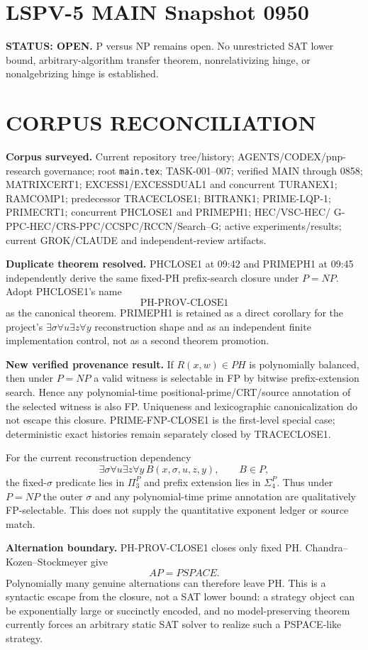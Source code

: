 \documentclass[11pt]{article}
\begin{document}
\section*{LSPV-5 MAIN Snapshot 0950}
\textbf{STATUS: OPEN.} P versus NP remains open. No unrestricted SAT lower bound,
arbitrary-algorithm transfer theorem, nonrelativizing hinge, or nonalgebrizing hinge is established.

\section*{CORPUS RECONCILIATION}
\textbf{Corpus surveyed.} Current repository tree/history; AGENTS/CODEX/pnp-research governance;
root \texttt{main.tex}; TASK-001--007; verified MAIN through 0858; MATRIXCERT1;
EXCESS1/EXCESSDUAL1 and concurrent TURANEX1; RAMCOMP1; predecessor TRACECLOSE1;
BITRANK1; PRIME-LQP-1; PRIMECRT1; concurrent PHCLOSE1 and PRIMEPH1; HEC/VSC-HEC/
G-PPC-HEC/CRS-PPC/CCSPC/RCCN/Search--G; active experiments/results; current GROK/CLAUDE
and independent-review artifacts.

\textbf{Duplicate theorem resolved.} PHCLOSE1 at 09:42 and PRIMEPH1 at 09:45 independently
derive the same fixed-PH prefix-search closure under \(P=NP\). Adopt PHCLOSE1's name
\[
\boxed{\text{PH-PROV-CLOSE1}}
\]
as the canonical theorem. PRIMEPH1 is retained as a direct corollary for the project's
\(\exists\sigma\forall u\exists z\forall y\) reconstruction shape and as an independent finite
implementation control, not as a second theorem promotion.

\textbf{New verified provenance result.}
If \(R(x,w)\in PH\) is polynomially balanced, then under \(P=NP\) a valid witness is selectable
in FP by bitwise prefix-extension search. Hence any polynomial-time positional-prime/CRT/source
annotation of the selected witness is also FP. Uniqueness and lexicographic canonicalization do not
escape this closure. PRIME-FNP-CLOSE1 is the first-level special case; deterministic exact histories
remain separately closed by TRACECLOSE1.

For the current reconstruction dependency
\[
\exists\sigma\forall u\exists z\forall y\,B(x,\sigma,u,z,y),\qquad B\in P,
\]
the fixed-\(\sigma\) predicate lies in \(\Pi_3^P\) and prefix extension lies in \(\Sigma_4^P\).
Thus under \(P=NP\) the outer \(\sigma\) and any polynomial-time prime annotation are
qualitatively FP-selectable. This does not supply the quantitative exponent ledger or source match.

\textbf{Alternation boundary.}
PH-PROV-CLOSE1 closes only fixed PH. Chandra--Kozen--Stockmeyer give
\[
AP=PSPACE.
\]
Polynomially many genuine alternations can therefore leave PH. This is a syntactic escape from the
closure, not a SAT lower bound: a strategy object can be exponentially large or succinctly encoded,
and no model-preserving theorem currently forces an arbitrary static SAT solver to realize such a
PSPACE-like strategy.
\end{document}
